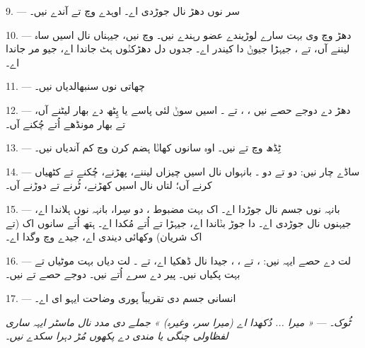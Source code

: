 \VUsaut{4.4mm}
\VUsaut{3.0mm}

9. ---  سر نوں دھڑ نال جوڑدی اے۔ اوہدے وچ  تے
 آندے نیں۔

10. --- دھڑ وچ وی بہت سارے لوڑیندے عضو رہندے نیں۔  وچ
 نیں، جیہناں نال اسیں ساہ لیننے آں، تے ، جیہڑا
جیوݨ دا کیندر اے۔ جدوں دل دھڑکݨوں ہٹ جاندا اے، جیو مر جاندا اے۔

11. ---  چھاتی نوں سنبھالدیاں نیں۔

12. --- دھڑ دے دوجے حصے نیں ، ،  تے
۔ اسیں سوݨ لئی پاسے یا پِٹھ دے بھار لیٹنے آں، تے بھار مونڈھے اُتے
چُکنے آں۔

13. --- ٹِڈھ وچ  تے  نیں۔ اوہ سانوں کھاݨا ہضم کرن
وچ کم آندیاں نیں۔

\VUsaut{4.4mm}
\VUsaut{3.0mm}

14. --- ساڈے چار  نیں: دو  تے دو ۔
بانہواں نال اسیں چیزاں لیننے، پھڑنے، چُکنے تے کٹھیاں کرنے آں؛ لتاں نال اسیں
کھڑنے، ٹُرنے تے دوڑنے آں۔

15. ---  بانہہ نوں جسم نال جوڑدا اے۔ اک بہت مضبوط
، دو سِرا، بانہہ نوں ہلاندا اے، جیہنوں 
 نال جوڑدی اے۔   دا جوڑ بݨاندا
اے، جیہڑا  تے  اُتے مُکدا اے۔ ہتھ اُتے سانوں اک
 (تے اک شریان) وکھائی دیندی اے، جیدے وچ  وگدا اے۔

16. --- لت دے حصے ایہہ نیں: ،  تے
، ، جیدا 
 نال ڈھکیا اے،  تے ۔ لت دیاں
 بہت موٹیاں تے بہت پکیاں نیں۔ پیر دے سرے اُتے
 نیں۔ دوجے حصے  تے  نیں۔

17. --- انسانی جسم دی تقریباً پوری وضاحت ایہو ای اے۔

\textit{ٹُوک۔} --- \textit{« میرا ... دُکھدا اے (میرا سر، وغیرہ) » جملے دی مدد
نال ماسٹر ایہہ ساری لفظاولی چنگی یا مندی}  \textit{دے پکھوں
مُڑ دہرا سکدے نیں۔}

\VUsaut{5.0mm}
\VUsaut{2.4mm}
\VUsaut{3.0mm}

